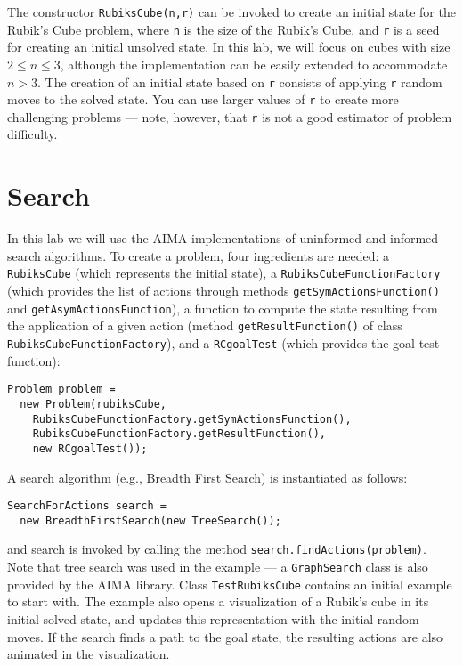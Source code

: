 \documentclass[a4paper]{article}
\begin{document}
The constructor {\tt RubiksCube(n,r)} can be invoked to create an initial state for the Rubik's Cube problem, where {\tt n} is the size of the Rubik's Cube, and {\tt r} is a seed for creating an initial unsolved state. In this lab, we will focus on cubes with size $2 \leq n \leq 3$, although the implementation can be easily extended to accommodate $n > 3$.  The creation of an initial state based on {\tt r} consists of applying {\tt r} random moves to the solved state.  You can use larger values of {\tt r} to create more challenging problems --- note, however, that {\tt r} is not a good estimator of problem difficulty.

\section{Search}
In this lab we will use the AIMA implementations of uninformed and informed search algorithms.  To create a problem, four ingredients are needed: a {\tt RubiksCube} (which represents the initial state), a {\tt RubiksCubeFunctionFactory} (which provides the list of actions through methods {\tt getSymActionsFunction()} and {\tt getAsymActionsFunction}), a function to compute the state resulting from the application of a given action (method {\tt getResultFunction()} of class {\tt RubiksCubeFunctionFactory}), and a {\tt RCgoalTest} (which provides the goal test function):

\begin{lstlisting}
Problem problem =
  new Problem(rubiksCube,
    RubiksCubeFunctionFactory.getSymActionsFunction(),
    RubiksCubeFunctionFactory.getResultFunction(),
    new RCgoalTest());
\end{lstlisting}

\noindent A search algorithm (e.g., Breadth First Search) is instantiated as follows:

\begin{lstlisting}
SearchForActions search =
  new BreadthFirstSearch(new TreeSearch());
\end{lstlisting}

\noindent and search is invoked by calling the method {\tt search.findActions(problem)}.  Note that tree search was used in the example --- a {\tt GraphSearch} class is also provided by the AIMA library.  Class {\tt TestRubiksCube} contains an initial example to start with. The example also opens a visualization of a Rubik's cube in its initial solved state, and updates this representation with the initial random moves. If the search finds a path to the goal state, the resulting actions are also animated in the visualization. 
\end{document}
